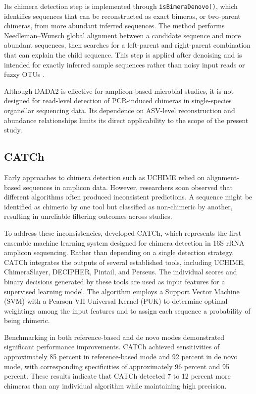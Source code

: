 Its chimera detection step is implemented through \texttt{isBimeraDenovo()}, which identifies sequences that can be reconstructed as exact bimeras, or two-parent chimeras, from more abundant inferred sequences. The method performs Needleman--Wunsch global alignment between a candidate sequence and more abundant sequences, then searches for a left-parent and right-parent combination that can explain the child sequence. This step is applied after denoising and is intended for exactly inferred sample sequences rather than noisy input reads or fuzzy OTUs \citep{Callahan2016}.

Although DADA2 is effective for amplicon-based microbial studies, it is not designed for read-level detection of PCR-induced chimeras in single-species organellar sequencing data. Its dependence on ASV-level reconstruction and abundance relationships limits its direct applicability to the scope of the present study.

\subsection{CATCh}

Early approaches to chimera detection such as UCHIME relied on alignment-based sequences in amplicon data. However, researchers soon observed that different algorithms often produced inconsistent predictions. A sequence might be identified as chimeric by one tool but classified as non-chimeric by another, resulting in unreliable filtering outcomes across studies.

To address these inconsistencies, \cite{Mysara2015} developed CATCh, which represents the first ensemble machine learning system designed for chimera detection in 16S rRNA amplicon sequencing. Rather than depending on a single detection strategy, CATCh integrates the outputs of several established tools, including UCHIME, ChimeraSlayer, DECIPHER, Pintail, and Perseus. The individual scores and binary decisions generated by these tools are used as input features for a supervised learning model. The algorithm employs a Support Vector Machine (SVM) with a Pearson VII Universal Kernel (PUK) to determine optimal weightings among the input features and to assign each sequence a probability of being chimeric.

Benchmarking in both reference-based and de novo modes demonstrated significant performance improvements. CATCh achieved sensitivities of approximately 85 percent in reference-based mode and 92 percent in de novo mode, with corresponding specificities of approximately 96 percent and 95 percent. These results indicate that CATCh detected 7 to 12 percent more chimeras than any individual algorithm while maintaining high precision.

